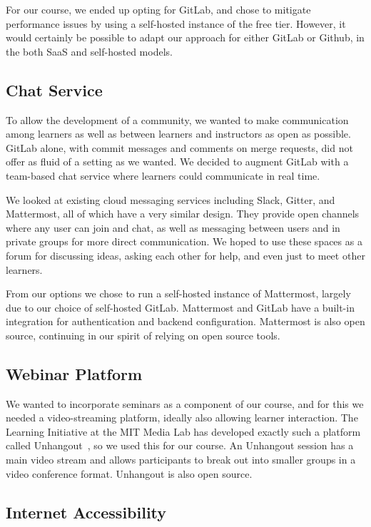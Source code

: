 \documentclass[12pt,twoside]{mitthesis}
\newcommand{\draft}[1]{{\color{blue} #1}}
\begin{document}
For our course, we ended up opting for GitLab, and chose to mitigate performance issues by using a self-hosted instance of the free tier. However, it would certainly be possible to adapt our approach for either GitLab or Github, in the both SaaS and self-hosted models.

\subsection{Chat Service}

To allow the development of a community, we wanted to make communication among learners as well as between learners and instructors as open as possible. GitLab alone, with commit messages and comments on merge requests, did not offer as fluid of a setting as we wanted. We decided to augment GitLab with a team-based chat service where learners could communicate in real time.

We looked at existing cloud messaging services including Slack, Gitter, and Mattermost, all of which have a very similar design. They provide open channels where any user can join and chat, as well as messaging between users and in private groups for more direct communication. We hoped to use these spaces as a forum for discussing ideas, asking each other for help, and even just to meet other learners.

From our options we chose to run a self-hosted instance of Mattermost, largely due to our choice of self-hosted GitLab. Mattermost and GitLab have a built-in integration for authentication and backend configuration. Mattermost is also open source, continuing in our spirit of relying on open source tools.

\subsection{Webinar Platform}

\draft{We wanted to incorporate seminars as a component of our course, and for this we needed a video-streaming platform, ideally also allowing learner interaction. The Learning Initiative at the MIT Media Lab has developed exactly such a platform called Unhangout~\cite{unhangout}, so we used this for our course. An Unhangout session has a main video stream and allows participants to break out into smaller groups in a video conference format. Unhangout is also open source.}

\subsection{Internet Accessibility}
\end{document}
